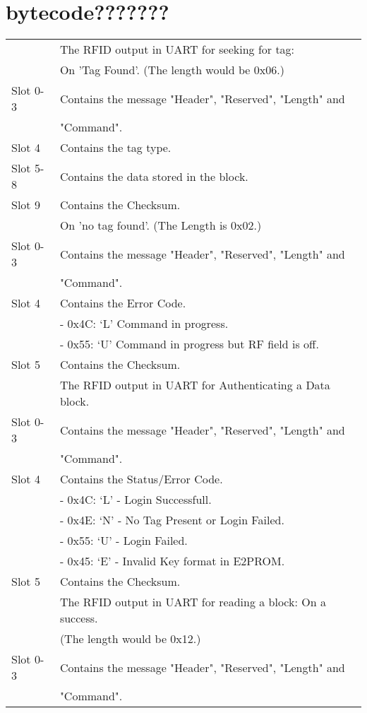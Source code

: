\chapter{bytecode???????}
\label{append:bytecode}
\begin{tabular}{|l|l|}
\hline
\hline
& The RFID output in UART for seeking for tag:\\
&  On 'Tag Found'. (The length would be 0x06.)\\
\hline
Slot 0-3 & Contains the message "Header", "Reserved", "Length" and\\
& "Command".\\
Slot 4 & Contains the tag type. \\
Slot 5-8 & Contains the data stored in the block.\\
Slot 9 & Contains the Checksum.\\
\hline
&On 'no tag found'. (The Length is 0x02.)\\
\hline
Slot 0-3 & Contains the message "Header", "Reserved", "Length" and\\
& "Command".\\
Slot 4 & Contains the Error Code.\\
& \indent - 0x4C: `L' Command in progress.\\
& \indent - 0x55: `U' Command in progress but RF field is off.\\
Slot 5 & Contains the Checksum.\\
\hline
\hline
&The RFID output in UART for Authenticating a Data block.\\
\hline
Slot 0-3 & Contains the message "Header", "Reserved", "Length" and\\
& "Command".\\
Slot 4 & Contains the Status/Error Code.\\
& \indent - 0x4C: `L' - Login Successfull.\\
& \indent - 0x4E: `N' - No Tag Present or Login Failed.\\
& \indent - 0x55: `U' - Login Failed.\\
& \indent - 0x45: `E' - Invalid Key format in E2PROM.\\
Slot 5 & Contains the Checksum.\\
\hline
\hline 
& The RFID output in UART for reading a block: On a success.\\
& (The length would be 0x12.) \\
\hline
Slot 0-3 & Contains the message "Header", "Reserved", "Length" and\\
& "Command".\\

\end{tabular}
